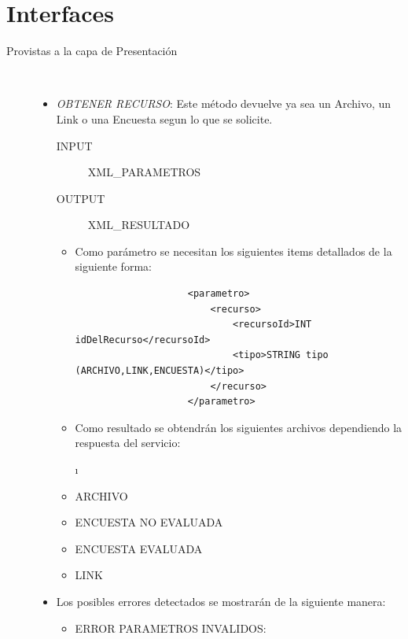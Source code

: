 \documentclass{article}
\begin{document}
\section{Interfaces}
	\begin{description}
		\item[Provistas a la capa de Presentaci\'on ] \
		\renewcommand{\labelitemi}{\ding{105}} 
		\begin{itemize}
		\item \emph{OBTENER RECURSO}:
			Este m\'etodo devuelve ya sea un Archivo, un Link o una Encuesta segun lo que se solicite.
			\begin{description}
				\item[INPUT] XML\_PARAMETROS
				\item[OUTPUT] XML\_RESULTADO\\
			\end{description}
		
		\begin{itemize}
			\item Como par\'ametro se necesitan los siguientes items detallados de la siguiente forma:
				
				\begin{verbatim}
					<parametro>
						<recurso>
							<recursoId>INT idDelRecurso</recursoId>
							<tipo>STRING tipo (ARCHIVO,LINK,ENCUESTA)</tipo>
						</recurso>
					</parametro>
				\end{verbatim}
				
			\item Como resultado se obtendr\'an los siguientes archivos dependiendo la respuesta del servicio:
			
			\i	\item ARCHIVO 
			
				
			
			\item ENCUESTA NO EVALUADA
			
			
			
			\item ENCUESTA EVALUADA
									
			
			
			\item LINK
			
			

		
		\end{itemize}
			\item Los posibles errores detectados se mostrar\'an de la siguiente manera:
			\begin{itemize}
				\item ERROR PARAMETROS INVALIDOS:
				

\end{itemize}
\end{itemize}
\end{description}
\end{document}
